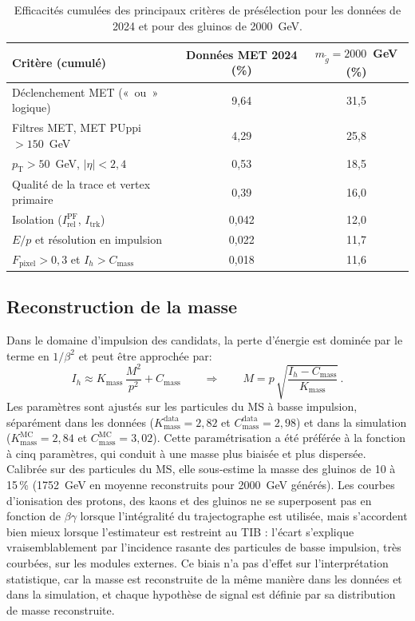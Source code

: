 \begin{table}[h!]
    \centering
    \small
    \renewcommand{\arraystretch}{1.25}
    \begin{tabular}{lcc}
        \toprule
        Critère (cumulé) & Données MET 2024 (\%) & $m_{\tilde{g}}=2000$~GeV (\%) \\
        \midrule
        Déclenchement MET («~ou~» logique) & 9,64 & 31,5 \\
        Filtres MET, MET PUppi $>150$~GeV & 4,29 & 25,8 \\
        $p_\mathrm{T}>50$~GeV, $|\eta|<2{,}4$ & 0,53 & 18,5 \\
        Qualité de la trace et vertex primaire & 0,39 & 16,0 \\
        Isolation ($I_\mathrm{rel}^\mathrm{PF}$, $I_\mathrm{trk}$) & 0,042 & 12,0 \\
        $E/p$ et résolution en impulsion & 0,022 & 11,7 \\
        $F_\mathrm{pixel}>0{,}3$ et $I_h>C_\mathrm{mass}$ & 0,018 & 11,6 \\
        \bottomrule
    \end{tabular}
    \caption{Efficacités cumulées des principaux critères de présélection pour les données de 2024 et pour des gluinos de 2000~GeV.}
    \label{tab:resume:cutflow}
\end{table}

\subsection{Reconstruction de la masse}
\label{subsec:resume:masse}

Dans le domaine d'impulsion des candidats, la perte d'énergie est dominée par le terme en $1/\beta^2$ et peut être approchée par:
\begin{equation}
    I_h\approx K_\mathrm{mass}\,\frac{M^2}{p^2}+C_\mathrm{mass}
    \qquad\Longrightarrow\qquad
    M=p\,\sqrt{\frac{I_h-C_\mathrm{mass}}{K_\mathrm{mass}}} \, .
\end{equation}
Les paramètres sont ajustés sur les particules du MS à basse impulsion, séparément dans les données ($K_\mathrm{mass}^\mathrm{data}=2{,}82$ et $C_\mathrm{mass}^\mathrm{data}=2{,}98$) et dans la simulation ($K_\mathrm{mass}^\mathrm{MC}=2{,}84$ et $C_\mathrm{mass}^\mathrm{MC}=3{,}02$). Cette paramétrisation a été préférée à la fonction à cinq paramètres, qui conduit à une masse plus biaisée et plus dispersée. Calibrée sur des particules du MS, elle sous-estime la masse des gluinos de 10 à 15\,\% (1752~GeV en moyenne reconstruits pour 2000~GeV générés). Les courbes d'ionisation des protons, des kaons et des gluinos ne se superposent pas en fonction de $\beta\gamma$ lorsque l'intégralité du trajectographe est utilisée, mais s'accordent bien mieux lorsque l'estimateur est restreint au TIB : l'écart s'explique vraisemblablement par l'incidence rasante des particules de basse impulsion, très courbées, sur les modules externes. Ce biais n'a pas d'effet sur l'interprétation statistique, car la masse est reconstruite de la même manière dans les données et dans la simulation, et chaque hypothèse de signal est définie par sa distribution de masse reconstruite.

